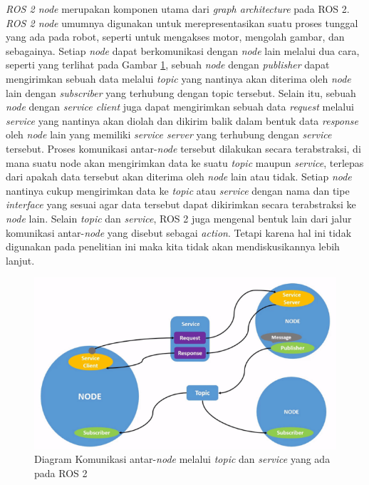 \textit{ROS 2 node} merupakan komponen utama dari \textit{graph architecture} pada ROS 2. \textit{ROS 2 node} umumnya digunakan untuk
merepresentasikan suatu proses tunggal yang ada pada robot, seperti untuk mengakses motor, mengolah gambar, dan sebagainya.
Setiap \textit{node} dapat berkomunikasi dengan \textit{node} lain melalui dua cara, seperti yang terlihat pada Gambar \ref{fig:ros2node}, sebuah \textit{node} dengan \textit{publisher} dapat mengirimkan sebuah data melalui
\textit{topic} yang nantinya akan diterima oleh \textit{node} lain dengan \textit{subscriber} yang terhubung dengan topic tersebut. Selain itu, sebuah \textit{node}
dengan \textit{service client} juga dapat mengirimkan sebuah data \textit{request} melalui \textit{service} yang nantinya akan diolah dan dikirim balik dalam
bentuk data \textit{response} oleh \textit{node} lain yang memiliki \textit{service server} yang terhubung dengan \textit{service} tersebut.
Proses komunikasi antar-\textit{node} tersebut dilakukan secara terabstraksi, di mana suatu node akan mengirimkan data ke suatu \textit{topic} maupun \textit{service}, terlepas dari apakah data tersebut
akan diterima oleh \textit{node} lain atau tidak. Setiap \textit{node} nantinya cukup mengirimkan data ke \textit{topic} atau \textit{service} dengan nama dan tipe
\textit{interface} yang sesuai agar data tersebut dapat dikirimkan secara terabstraksi ke \textit{node} lain.
Selain \textit{topic} dan \textit{service}, ROS 2 juga mengenal bentuk lain dari jalur komunikasi antar-\textit{node} yang disebut sebagai \textit{action}. Tetapi karena hal ini tidak digunakan pada penelitian ini maka kita tidak akan mendiskusikannya lebih lanjut. 
\begin{figure}[ht]
  \centering
  \includegraphics[scale=0.9]{gambar/ros2_node.png}
  \caption{Diagram Komunikasi antar-\textit{node} melalui \textit{topic} dan \textit{service} yang ada pada ROS 2}
  \label{fig:ros2node}
\end{figure}

